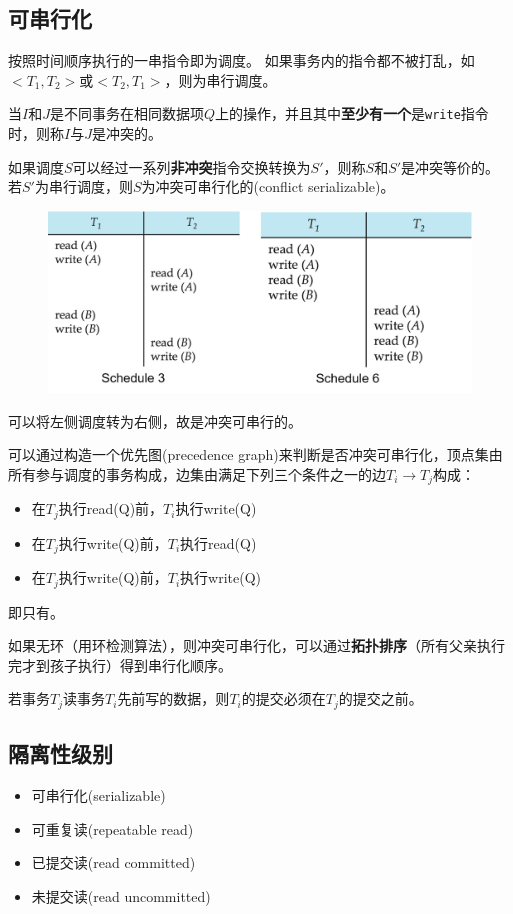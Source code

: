 \subsection{可串行化}
\begin{definition}[调度]
按照时间顺序执行的一串指令即为调度。
如果事务内的指令都不被打乱，如$<T_1,T_2>$或$<T_2,T_1>$，则为串行调度。
\end{definition}
\begin{definition}[冲突]
当$I$和$J$是不同事务在相同数据项$Q$上的操作，并且其中\textbf{至少有一个}是\verb'write'指令时，则称$I$与$J$是冲突的。
\end{definition}
\begin{definition}
如果调度$S$可以经过一系列\textbf{非冲突}指令交换转换为$S'$，则称$S$和$S'$是冲突等价的。
若$S'$为串行调度，则$S$为冲突可串行化的(conflict serializable)。
\end{definition}
\begin{figure}[H]
\centering
\includegraphics[width=0.8\linewidth]{fig/conflict_serializability.png}
\end{figure}
可以将左侧调度转为右侧，故是冲突可串行的。

可以通过构造一个优先图(precedence graph)来判断是否冲突可串行化，顶点集由所有参与调度的事务构成，边集由满足下列三个条件之一的边$T_i\to T_j$构成：
\begin{itemize}
	\item 在$T_j$执行read(Q)前，$T_i$执行write(Q)
	\item 在$T_j$执行write(Q)前，$T_i$执行read(Q)
	\item 在$T_j$执行write(Q)前，$T_i$执行write(Q)
\end{itemize}
即只有。

如果无环（用环检测算法），则冲突可串行化，可以通过\textbf{拓扑排序}（所有父亲执行完才到孩子执行）得到串行化顺序。

\begin{definition}[可恢复调度]
若事务$T_j$读事务$T_i$先前写的数据，则$T_i$的提交必须在$T_j$的提交之前。
\end{definition}

\subsection{隔离性级别}
\begin{itemize}
	\item 可串行化(serializable)
	\item 可重复读(repeatable read)
	\item 已提交读(read committed)
	\item 未提交读(read uncommitted)
\end{itemize}